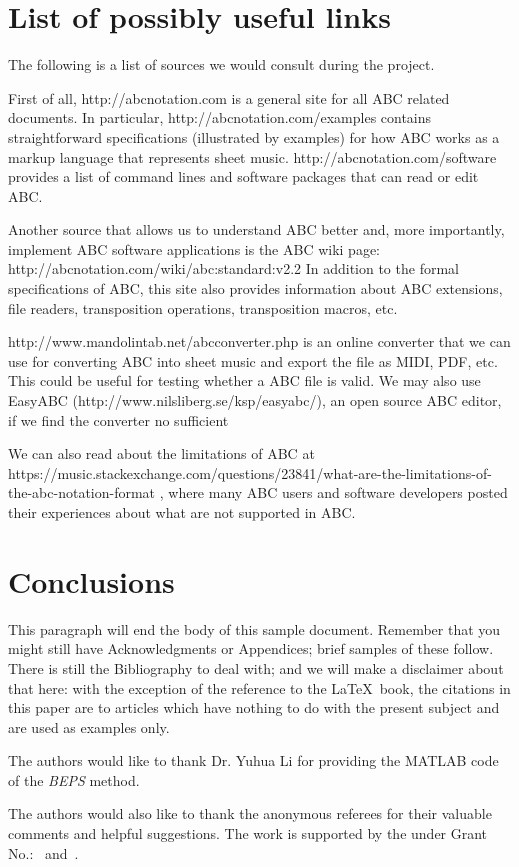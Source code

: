 \section{List of possibly useful links}
The following is a list of sources we would consult during the project. 

First of all, http://abcnotation.com is a general site for all ABC related documents. In particular, http://abcnotation.com/examples contains straightforward specifications (illustrated by examples) for how ABC works as a markup language that represents sheet music. http://abcnotation.com/software provides a list of command lines and software packages that can read or edit ABC. 

Another source that allows us to understand ABC better and, more importantly, implement ABC software applications is the ABC wiki page: http://abcnotation.com/wiki/abc:standard:v2.2 In addition to the formal specifications of ABC, this site also provides information about ABC extensions, file readers, transposition operations, transposition macros, etc. 

http://www.mandolintab.net/abcconverter.php is an online converter that we can use for converting ABC into sheet music and export the file as MIDI, PDF, etc. This could be useful for testing whether a ABC file is valid. We may also use EasyABC (http://www.nilsliberg.se/ksp/easyabc/), an open source ABC editor, if we find the converter no sufficient

We can also read about the limitations of ABC at https://music.stackexchange.com/questions/23841/what-are-the-limitations-of-the-abc-notation-format
, where many ABC users and software developers posted their experiences about what are not supported in ABC.



\section{Conclusions}
This paragraph will end the body of this sample document.
Remember that you might still have Acknowledgments or
Appendices; brief samples of these
follow.  There is still the Bibliography to deal with; and
we will make a disclaimer about that here: with the exception
of the reference to the \LaTeX\ book, the citations in
this paper are to articles which have nothing to
do with the present subject and are used as
examples only.


\begin{acks}
  The authors would like to thank Dr. Yuhua Li for providing the
  MATLAB code of the \textit{BEPS} method.

  The authors would also like to thank the anonymous referees for
  their valuable comments and helpful suggestions. The work is
  supported by the  under Grant
  No.:~
  and~.

\end{acks}
